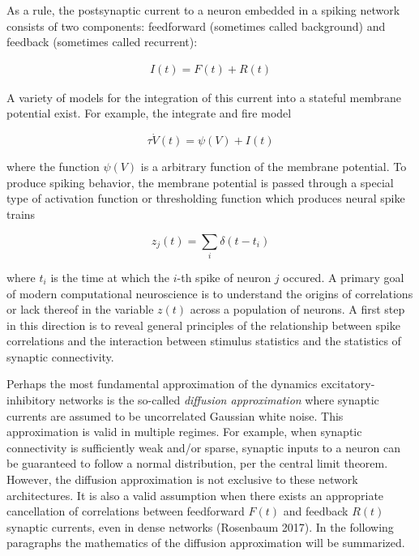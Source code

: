 \documentclass{ucetd}
\begin{document}
As a rule, the postsynaptic current to a neuron embedded in a spiking network consists of two components: feedforward (sometimes called background) and feedback (sometimes called recurrent):

\begin{align}
I(t) = F(t) + R(t)
\end{align}

A variety of models for the integration of this current into a stateful membrane potential exist. For example, the integrate and fire model

\begin{equation}
\tau\dot{V}(t) = \psi(V) + I(t)
\end{equation}

where the function $\psi(V)$ is a arbitrary function of the membrane potential. To produce spiking behavior, the membrane potential is passed through a special type of activation function or thresholding function which produces neural spike trains

\begin{equation}
z_{j}(t) = \sum_{i} \delta(t-t_{i})
\end{equation}

where $t_{i}$ is the time at which the $i$-th spike of neuron $j$ occured. A primary goal of modern computational neuroscience is to understand the origins of correlations or lack thereof in the variable $z(t)$ across a population of neurons. A first step in this direction is to reveal general principles of the relationship between spike correlations and the interaction between stimulus statistics and the statistics of synaptic connectivity.

Perhaps the most fundamental approximation of the dynamics excitatory-inhibitory networks is the so-called \emph{diffusion approximation} where synaptic currents are assumed to be uncorrelated Gaussian white noise. This approximation is valid in multiple regimes. For example, when synaptic connectivity is sufficiently weak and/or sparse, synaptic inputs to a neuron can be guaranteed to follow a normal distribution, per the central limit theorem. However, the diffusion approximation is not exclusive to these network architectures. It is also a valid assumption when there exists an appropriate cancellation of correlations between feedforward $F(t)$ and feedback $R(t)$ synaptic currents, even in dense networks (Rosenbaum 2017). In the following paragraphs the mathematics of the diffusion approximation will be summarized.
\end{document}
